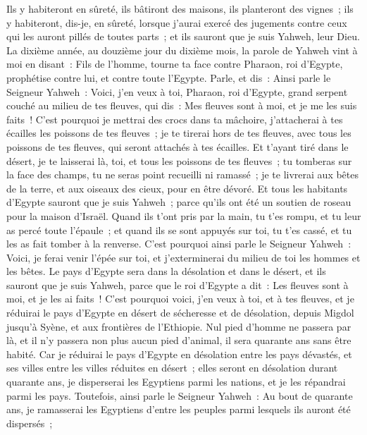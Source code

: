 \begin{multicols}{2}
Ils y habiteront en sûreté, ils bâtiront des maisons, ils planteront des vignes~; ils y habiteront, dis-je, en sûreté, lorsque j'aurai exercé des jugements contre ceux qui les auront pillés de toutes parts~; et ils sauront que je suis Yahweh, leur Dieu.
\VerseOne{}La dixième année, au douzième jour du dixième mois, la parole de Yahweh vint à moi en disant~:
Fils de l'homme, tourne ta face contre Pharaon, roi d'Egypte, prophétise contre lui, et contre toute l'Egypte.
Parle, et dis~: Ainsi parle le Seigneur Yahweh~: Voici, j'en veux à toi, Pharaon, roi d'Egypte, grand serpent couché au milieu de tes fleuves, qui dis~: Mes fleuves sont à moi, et je me les suis faits~!
C'est pourquoi je mettrai des crocs dans ta mâchoire, j'attacherai à tes écailles les poissons de tes fleuves~; je te tirerai hors de tes fleuves, avec tous les poissons de tes fleuves, qui seront attachés à tes écailles.
Et t'ayant tiré dans le désert, je te laisserai là, toi, et tous les poissons de tes fleuves~; tu tomberas sur la face des champs, tu ne seras point recueilli ni ramassé~; je te livrerai aux bêtes de la terre, et aux oiseaux des cieux, pour en être dévoré.
Et tous les habitants d'Egypte sauront que je suis Yahweh~; parce qu'ils ont été un soutien de roseau pour la maison d'Israël.
Quand ils t'ont pris par la main, tu t'es rompu, et tu leur as percé toute l'épaule~; et quand ils se sont appuyés sur toi, tu t'es cassé, et tu les as fait tomber à la renverse.
C'est pourquoi ainsi parle le Seigneur Yahweh~: Voici, je ferai venir l'épée sur toi, et j'exterminerai du milieu de toi les hommes et les bêtes.
Le pays d'Egypte sera dans la désolation et dans le désert, et ils sauront que je suis Yahweh, parce que le roi d'Egypte a dit~: Les fleuves sont à moi, et je les ai faits~!
C'est pourquoi voici, j'en veux à toi, et à tes fleuves, et je réduirai le pays d'Egypte en désert de sécheresse et de désolation, depuis Migdol jusqu'à Syène, et aux frontières de l'Ethiopie.
Nul pied d'homme ne passera par là, et il n'y passera non plus aucun pied d'animal, il sera quarante ans sans être habité.
Car je réduirai le pays d'Egypte en désolation entre les pays dévastés, et ses villes entre les villes réduites en désert~; elles seront en désolation durant quarante ans, je disperserai les Egyptiens parmi les nations, et je les répandrai parmi les pays.
Toutefois, ainsi parle le Seigneur Yahweh~: Au bout de quarante ans, je ramasserai les Egyptiens d'entre les peuples parmi lesquels ils auront été dispersés~;

\end{multicols}
